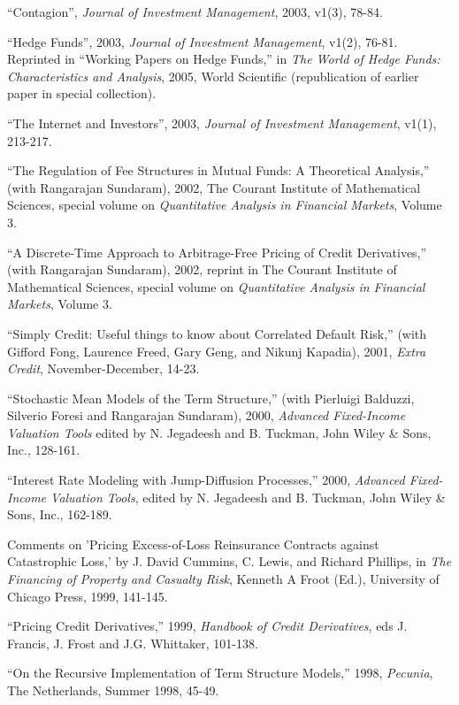 \documentclass{article}
\begin{document}
\begin{etaremune}
\item ``Contagion'', {\it Journal of
Investment Management}, 2003, v1(3), 78-84.

\item ``Hedge Funds'', 2003, {\it Journal of
Investment Management}, v1(2), 76-81. Reprinted in
``Working Papers on Hedge Funds,'' in 
{\it The World of Hedge Funds: Characteristics and Analysis}, 
2005, World Scientific (republication of earlier paper in special
collection). 

\item ``The Internet and Investors'', 2003, {\it Journal 
of Investment Management}, v1(1), 213-217.

\item ``The Regulation of Fee Structures in Mutual Funds: A
Theoretical Analysis,'' (with Rangarajan Sundaram), 2002, 
The Courant Institute of Mathematical
Sciences, special volume on {\it Quantitative Analysis in Financial
Markets}, Volume 3. 

\item 
``A Discrete-Time Approach to Arbitrage-Free Pricing of Credit
Derivatives,'' (with Rangarajan Sundaram), 2002,
reprint in The Courant Institute of Mathematical
Sciences, special volume on {\it Quantitative Analysis in Financial
Markets}, Volume 3. 

\item ``Simply Credit: Useful things to know about Correlated
Default Risk,'' (with Gifford Fong, Laurence Freed, Gary Geng, and
Nikunj Kapadia), 2001, {\it Extra Credit}, November-December, 14-23.

\item
``Stochastic Mean Models of the Term Structure,''
(with Pierluigi Balduzzi, Silverio Foresi and Rangarajan Sundaram), 
2000, {\it Advanced Fixed-Income Valuation Tools}
edited by N. Jegadeesh and B. Tuckman,
John Wiley \& Sons, Inc., 128-161.

\item
``Interest Rate Modeling with Jump-Diffusion Processes,'' 2000,
{\it Advanced Fixed-Income Valuation Tools}, edited by
N. Jegadeesh and B. Tuckman, John Wiley \& Sons, Inc., 162-189.

\item
Comments on 'Pricing Excess-of-Loss Reinsurance Contracts against
Catastrophic Loss,' by J. David Cummins, C. Lewis, and Richard Phillips,
in {\it The Financing of Property and Casualty Risk}, Kenneth A
Froot (Ed.), University of Chicago Press, 1999, 141-145. 

\item ``Pricing Credit Derivatives,'' 1999, {\it Handbook of Credit
Derivatives}, eds J. Francis, J. Frost and J.G. Whittaker, 101-138.



\item
``On the Recursive Implementation of Term Structure Models,'' 
1998, {\it Pecunia}, The Netherlands, Summer 1998, 45-49.


\end{etaremune}
\end{document}
